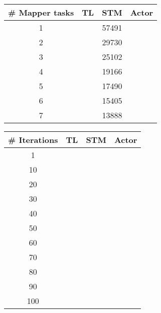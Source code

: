 \begin{center}
\begin{table}[h]
\centering
\begin{tabular}{c|ccc}
\# Mapper tasks 	& \ac{TL}   & \ac{STM}   & Actor \\ \hline
1                   &           &     57491       &       \\
2                   &           &     29730       &       \\
3                   &           &     25102       &       \\
4                   &           &     19166       &       \\
5                   &           &     17490       &       \\
6                   &           &     15405       &       \\
7                   &           &     13888       &      
\end{tabular}
\end{table}
\label{table:test_results_concurrent_tasks}
\end{center}

\begin{center}
\begin{table}[h]
\centering
\begin{tabular}{c|ccc}
\# Iterations 	& \ac{TL}   & \ac{STM}   & Actor \\ \hline
1     			&           &            &       \\
10	     		&           &            &       \\
20	     		&           &            &       \\
30	    		&           &            &       \\
40	    		&           &            &       \\
50	    		&           &            &       \\
60	    		&           &            &       \\
70	    		&           &            &       \\
80	    		&           &            &       \\
90	    		&           &            &       \\
100	    		&           &            &      
\end{tabular}
\end{table}
\label{table:test_results_iterations}
\end{center}

\worksheetend